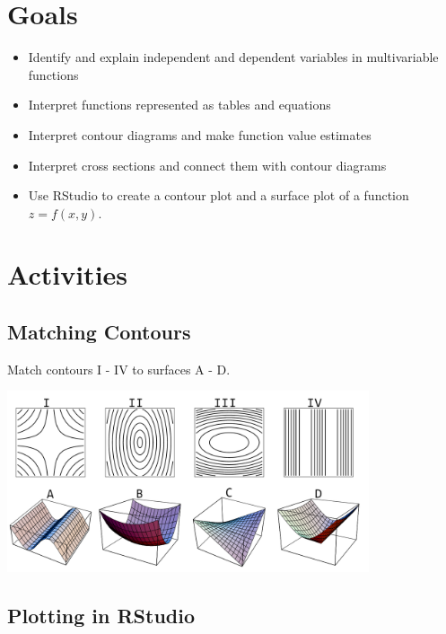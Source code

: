 \documentclass[
]{book}
\providecommand{\tightlist}{%
  \setlength{\itemsep}{0pt}\setlength{\parskip}{0pt}}
\begin{document}
\hypertarget{goals-6}{%
\section{Goals}\label{goals-6}}

\begin{itemize}
\tightlist
\item
  Identify and explain independent and dependent variables in
  multivariable functions
\item
  Interpret functions represented as tables and equations
\item
  Interpret contour diagrams and make function value estimates
\item
  Interpret cross sections and connect them with contour
  diagrams
\item
  Use RStudio to create a contour plot and a surface plot of a function \(z=f(x,y)\).
\end{itemize}

\hypertarget{activities-6}{%
\section{Activities}\label{activities-6}}

\hypertarget{matching-contours}{%
\subsection{Matching Contours}\label{matching-contours}}

Match contours I - IV to surfaces A - D.

\includegraphics[width=0.8\textwidth,height=\textheight]{images/contour-match.png}

\hypertarget{plotting-in-rstudio}{%
\subsection{Plotting in RStudio}\label{plotting-in-rstudio}}
\end{document}
